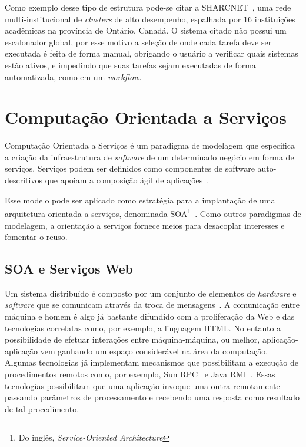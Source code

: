 \documentclass[12pt]{report} %
\begin{document}
	    Como exemplo desse tipo de estrutura pode-se citar a SHARCNET~\cite{sharcnet:website}, uma rede multi-institucional de \textit{clusters} de alto desempenho, espalhada por 16 instituições acadêmicas na província de Ontário, Canadá.
	    O sistema citado não possui um escalonador global, por esse motivo a seleção de onde cada tarefa deve ser executada é feita de forma manual, obrigando o usuário a verificar quais sistemas estão ativos, e impedindo que suas tarefas sejam executadas de forma automatizada, como em um \textit{workflow}.
      

    \section{Computação Orientada a Serviços}
	Computação Orientada a Serviços é um paradigma de modelagem que especifica a criação da infraestrutura de \textit{software} de um determinado negócio em forma de serviços.
	Serviços podem ser definidos como componentes de software auto-descritivos que apoiam a composição ágil de aplicações~\cite{Leymann02webservices}.
	
	Esse modelo pode ser aplicado como estratégia para a implantação de uma arquitetura orientada a serviços, denominada SOA\footnote{Do inglês, \textit{Service-Oriented Architecture}}~\cite{SOAPapa}.
	Como outros paradigmas de modelagem, a orientação a serviços fornece meios para desacoplar interesses e fomentar o reuso.
                                   
	\subsection{SOA e Serviços Web}
	    Um sistema distribuído é composto por um conjunto de elementos de \textit{hardware} e \textit{software} que se comunicam através da troca de mensagens~\cite{Coulouris}.
	    A comunicação entre máquina e homem é algo já bastante difundido com a proliferação da Web e das tecnologias correlatas como, por exemplo, a linguagem HTML.
	    No entanto a possibilidade de efetuar interações entre máquina-máquina, ou melhor, aplicação-aplicação vem ganhando um espaço considerável na área da computação.
	    Algumas tecnologias já implementam mecanismos que possibilitam a execução de procedimentos remotos como, por exemplo, Sun RPC~\cite{Coulouris} e Java RMI~\cite{BeginingJava}.
	    Essas tecnologias possibilitam que uma aplicação invoque uma outra remotamente passando parâmetros de processamento e recebendo uma resposta como resultado de tal procedimento.           
\end{document}
